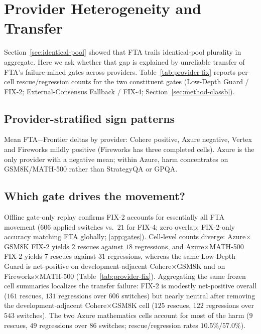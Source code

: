 \section{Provider Heterogeneity and Transfer}
\label{sec:provider-analysis}

Section~\ref{sec:identical-pool} showed that FTA trails identical-pool plurality in aggregate. Here
we ask whether that gap is explained by unreliable transfer of FTA's failure-mined gates across
providers. Table~\ref{tab:provider-fix} reports per-cell rescue/regression counts for the two
constituent gates (Low-Depth Guard / FIX-2; External-Consensus Fallback / FIX-4;
Section~\ref{sec:method-classb}).

\begin{table}[tbp]
\centering
\footnotesize
\setlength{\tabcolsep}{3pt}
\caption{Per-cell rescue/regression counts for FTA's gates (FIX-2 / FIX-4). Applied switches:
FIX-2~$606$, FIX-4~$21$, overlap~$0$. The table characterizes transfer of this failure-mined commit
rule.}
\label{tab:provider-fix}

\end{table}

\subsection{Provider-stratified sign patterns}

Mean FTA$-$Frontier deltas by provider: Cohere positive, Azure negative, Vertex and Fireworks
mildly positive (Fireworks has three completed cells). Azure is the only provider with a negative
mean; within Azure, harm concentrates on GSM8K/MATH-500 rather than StrategyQA or GPQA.

\subsection{Which gate drives the movement?}

Offline gate-only replay confirms FIX-2 accounts for essentially all FTA movement ($606$ applied
switches vs.\ $21$ for FIX-4; zero overlap; FIX-2-only accuracy matching FTA globally;
\ref{app:gates}). Cell-level counts diverge: Azure$\times$GSM8K FIX-2 yields $2$ rescues
against $18$ regressions, and Azure$\times$MATH-500 FIX-2 yields $7$ rescues against $31$
regressions, whereas the same Low-Depth Guard is net-positive on development-adjacent
Cohere$\times$GSM8K and on Fireworks$\times$MATH-500 (Table~\ref{tab:provider-fix}).
Aggregating the same frozen cell summaries localizes the transfer failure: FIX-2 is modestly
net-positive overall ($161$ rescues, $131$ regressions over $606$ switches) but nearly neutral after
removing the development-adjacent Cohere$\times$GSM8K cell ($125$ rescues, $122$ regressions over
$543$ switches). The two Azure mathematics cells account for most of the harm ($9$ rescues,
$49$ regressions over $86$ switches; rescue/regression rates $10.5\%/57.0\%$).

